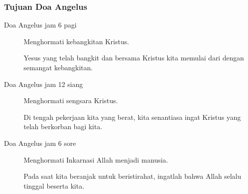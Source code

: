 \normalsize
\subsubsection*{Tujuan Doa Angelus}

\begin{description}
\item[Doa Angelus jam 6 pagi]
Menghormati kebangkitan Kristus.

Yesus yang telah bangkit dan bersama Kristus kita memulai dari dengan semangat kebangkitan.

\item[Doa Angelus jam 12 siang]
Menghormati sengsara Kristus.

Di tengah pekerjaan kita yang berat, kita senantiasa ingat Kristus yang telah berkorban bagi kita.

\item[Doa Angelus jam 6 sore]
Menghormati Inkarnasi Allah menjadi manusia.

Pada saat kita beranjak untuk beristirahat, ingatlah bahwa Allah selalu tinggal beserta kita.
\end{description}